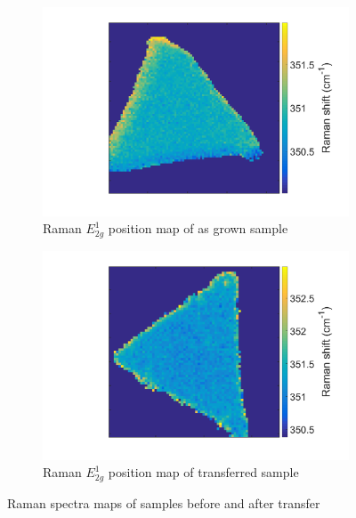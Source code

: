 \begin{figure}[ht]
\begin{center}
\begin{subfigure}[b]{0.4\textwidth}
			\includegraphics[scale=0.15]{Transfer/TransferRamanPositionEMapAsgrown.png}
			\caption{Raman $E^1_{2g}$ position map of as grown sample}
			\label{fig:TransferRamanPositionEMapAsgrown}
		\end{subfigure}
		\quad
		\begin{subfigure}[b]{0.4\textwidth}
			\includegraphics[scale=0.15]{Transfer/TransferRamanPositionEMapTransferred.png}
			\caption{Raman $E^1_{2g}$ position map of transferred sample}
			\label{fig:TransferRamanPositionEMapTransferred}
		\end{subfigure}
		\caption{Raman spectra maps of samples before and after transfer}
		\label{fig:TransferRamanMapsComparison}
	\end{center}
\end{figure}
	
